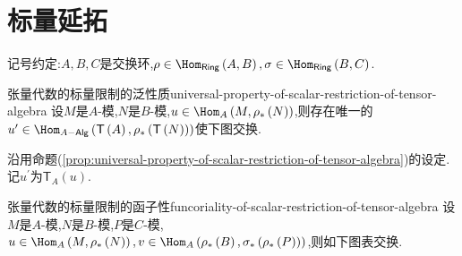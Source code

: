 \section{标量延拓}

记号约定:$A,B,C$是交换环,$\rho\in\Hom_{\mathsf{Ring}}\left(A,B\right),\sigma\in\Hom_{\mathsf{Ring}}\left(B,C\right)$.

\begin{proposition}{张量代数的标量限制的泛性质}{universal-property-of-scalar-restriction-of-tensor-algebra}
	设$M$是$A$-模,$N$是$B$-模,$u\in\Hom_{A}\left(M,\rho_{\ast}\left(N\right)\right)$,则存在唯一的$u^{\prime}\in\Hom_{A-\mathsf{Alg}}\left(\mathsf{T}\left(A\right),\rho_{\ast}\left(\mathsf{T}\left(N\right)\right)\right)$使下图交换.
	\begin{center}
	\end{center}
\end{proposition}

\begin{definition}{}{}
	沿用命题(\cref{prop:universal-property-of-scalar-restriction-of-tensor-algebra})的设定.记$u^{\prime}$为$\mathsf{T}_{A}\left(u\right)$.
\end{definition}

\begin{proposition}{张量代数的标量限制的函子性}{funcoriality-of-scalar-restriction-of-tensor-algebra}
	设$M$是$A$-模,$N$是$B$-模,$P$是$C$-模,$u\in\Hom_{A}\left(M,\rho_{\ast}\left(N\right)\right),v\in\Hom_{A}\left(\rho_{\ast}\left(B\right),\sigma_{\ast}\left(\rho_{\ast}\left(P\right)\right)\right)$,则如下图表交换.
	\begin{center}
	\end{center}
\end{proposition}

